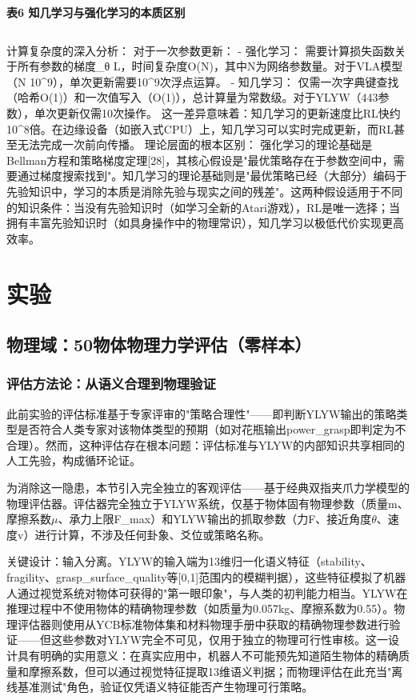 \documentclass[12pt,a4paper]{article}
\begin{document}
\begin{center}
\textbf{表6  知几学习与强化学习的本质区别}
\begin{tabular}{lcccc}
\hline
\end{tabular}
\end{center}
计算复杂度的深入分析：
对于一次参数更新：
- 强化学习： 需要计算损失函数关于所有参数的梯度\_θ L，时间复杂度O(N)，其中N为网络参数量。对于VLA模型（N  10^9），单次更新需要10^9次浮点运算。
- 知几学习： 仅需一次字典键查找（哈希O(1)）和一次值写入（O(1)），总计算量为常数级。对于YLYW（443参数），单次更新仅需10次操作。
这一差异意味着：知几学习的更新速度比RL快约10^8倍。在边缘设备（如嵌入式CPU）上，知几学习可以实时完成更新，而RL甚至无法完成一次前向传播。
理论层面的根本区别： 强化学习的理论基础是Bellman方程和策略梯度定理[28]，其核心假设是"最优策略存在于参数空间中，需要通过梯度搜索找到"。知几学习的理论基础则是"最优策略已经（大部分）编码于先验知识中，学习的本质是消除先验与现实之间的残差"。这两种假设适用于不同的知识条件：当没有先验知识时（如学习全新的Atari游戏），RL是唯一选择；当拥有丰富先验知识时（如具身操作中的物理常识），知几学习以极低代价实现更高效率。

\section{实验}

\subsection{物理域：50物体物理力学评估（零样本）}
\subsubsection{评估方法论：从语义合理到物理验证}

此前实验的评估标准基于专家评审的"策略合理性"——即判断YLYW输出的策略类型是否符合人类专家对该物体类型的预期（如对花瓶输出power\_grasp即判定为不合理）。然而，这种评估存在根本问题：评估标准与YLYW的内部知识共享相同的人工先验，构成循环论证。

为消除这一隐患，本节引入完全独立的客观评估——基于经典双指夹爪力学模型的物理评估器。评估器完全独立于YLYW系统，仅基于物体固有物理参数（质量m、摩擦系数$\mu$、承力上限F\_max）和YLYW输出的抓取参数（力F、接近角度$\theta$、速度v）进行计算，不涉及任何卦象、爻位或策略名称。

关键设计：输入分离。YLYW的输入端为13维归一化语义特征（stability、fragility、grasp\_surface\_quality等[0,1]范围内的模糊判据），这些特征模拟了机器人通过视觉系统对物体可获得的"第一眼印象"，与人类的初判能力相当。YLYW在推理过程中不使用物体的精确物理参数（如质量为0.057kg、摩擦系数为0.55）。物理评估器则使用从YCB标准物体集和材料物理手册中获取的精确物理参数进行验证——但这些参数对YLYW完全不可见，仅用于独立的物理可行性审核。这一设计具有明确的实用意义：在真实应用中，机器人不可能预先知道陌生物体的精确质量和摩擦系数，但可以通过视觉特征提取13维语义判据；而物理评估在此充当"离线基准测试"角色，验证仅凭语义特征能否产生物理可行策略。
\end{document}
